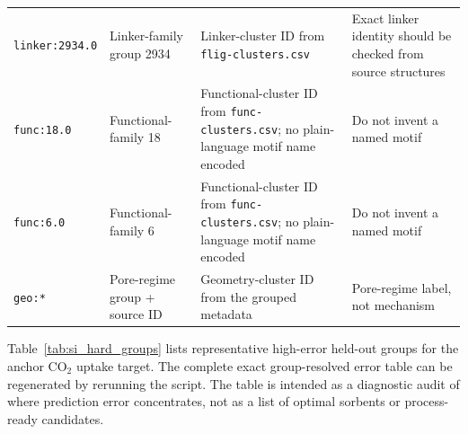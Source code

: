 \documentclass[11pt,a4paper]{article}
\begin{document}
\begin{table}[H]
\begin{tabular}{p{}p{}p{}p{}}
\texttt{linker:2934.0} & Linker-family group 2934 & Linker-cluster ID from \texttt{flig-clusters.csv} & Exact linker identity should be checked from source structures \\
\texttt{func:18.0} & Functional-family 18 & Functional-cluster ID from \texttt{func-clusters.csv}; no plain-language motif name encoded & Do not invent a named motif \\
\texttt{func:6.0} & Functional-family 6 & Functional-cluster ID from \texttt{func-clusters.csv}; no plain-language motif name encoded & Do not invent a named motif \\
\texttt{geo:*} & Pore-regime group + source ID & Geometry-cluster ID from the grouped metadata & Pore-regime label, not mechanism \\
\bottomrule
\end{tabular}
\end{table}


Table~\ref{tab:si_hard_groups} lists representative high-error held-out groups for
the anchor CO$_2$ uptake target. The complete exact group-resolved error table can be regenerated by
rerunning the script. The table is intended as a diagnostic audit of where prediction error concentrates,
not as a list of optimal sorbents or process-ready candidates.
\end{document}
